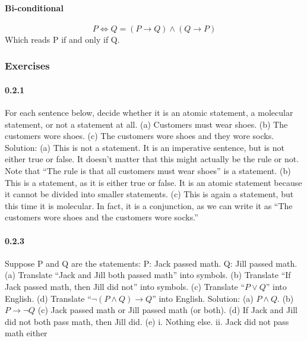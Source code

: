 \documentclass{article}
\begin{document}
\paragraph{Bi-conditional}
$$ P \Leftrightarrow Q =(P \to Q) \land (Q\to P)$$
Which reads P if and only if Q.
\subsubsection{Exercises}
\paragraph{0.2.1}
For each sentence below, decide whether it is an atomic statement, a
molecular statement, or not a statement at all.\newline
(a) Customers must wear shoes.\newline
(b) The customers wore shoes.\newline
(c) The customers wore shoes and they wore socks.\newline
Solution:\newline
(a) This is not a statement. It is an imperative sentence, but is not either
true or false. It doesn’t matter that this might actually be the rule or
not. Note that “The rule is that all customers must wear shoes” is a
statement.\newline
(b) This is a statement, as it is either true or false. It is an atomic statement
because it cannot be divided into smaller statements.\newline
(c) This is again a statement, but this time it is molecular. In fact, it is a
conjunction, as we can write it as “The customers wore shoes and
the customers wore socks.”
\paragraph{0.2.3}
Suppose P and Q are the statements: P: Jack passed math. Q: Jill passed math.\newline
(a) Translate “Jack and Jill both passed math” into symbols.\newline
(b) Translate “If Jack passed math, then Jill did not” into symbols.\newline
(c) Translate “$P \lor Q$” into English.\newline
(d) Translate “$\lnot (P \land Q) \to Q$” into English.\newline
Solution:\newline
(a) $P \land Q$.\newline
(b) $P\to \lnot Q$\newline
(c) Jack passed math or Jill passed math (or both).\newline
(d) If Jack and Jill did not both pass math, then Jill did.\newline
(e) i. Nothing else.\newline
ii. Jack did not pass math either
\end{document}
